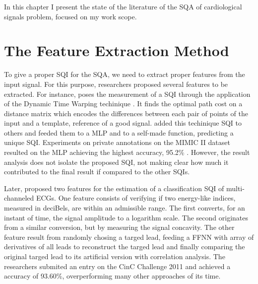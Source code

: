 

In this chapter I present the state of the literature of the \acrlong{SQA} of cardiological signals problem, focused on my work scope.

\section{The Feature Extraction Method}
\label{sec:feature}

To give a proper \acrshort{SQI} for the \acrshort{SQA}, we need to extract proper features from the input signal. For this purpose, researchers proposed several features to be extracted. For instance, \citeauthor{review-1} poses the measurement of a \acrshort{SQI} through the application of the Dynamic Time Warping techinique \cite{review-1}. It finds the optimal path cost on a distance matrix which encodes the differences between each pair of points of the input and a template, reference of a good signal. \citeauthor{review-1} added this techinique \acrshort{SQI} to others and feeded them to a \acrshort{MLP} and to a self-made function, predicting a unique \acrshort{SQI}. Experiments on private annotations on the MIMIC II dataset resulted on the \acrshort{MLP} achieving the highest accuracy, 95.2\% \cite{review-1}. However, the result analysis does not isolate the proposed \acrshort{SQI}, not making clear how much it contributed to the final result if compared to the other \acrshort{SQI}s.      

Later, \citeauthor{review-2} proposed two features for the estimation of a classification \acrshort{SQI} of multi-channeled \acrshort{ECG}s. One feature consists of verifying if two energy-like indices, measured in deciBels, are within an admissible range. The first converts, for an instant of time, the signal amplitude to a logarithm scale. The second originates from a similar conversion, but by measuring the signal concavity. The other feature result from randomly chosing a targed lead, feeding a \acrshort{FFNN} with array of derivatives of all leads to reconstruct the targed lead and finally comparing the original targed lead to its artificial version with correlation analysis. The researchers submited an entry on the CinC Challenge 2011 and achieved a accuracy of 93.60\%, overperforming many other approaches of its time.  

